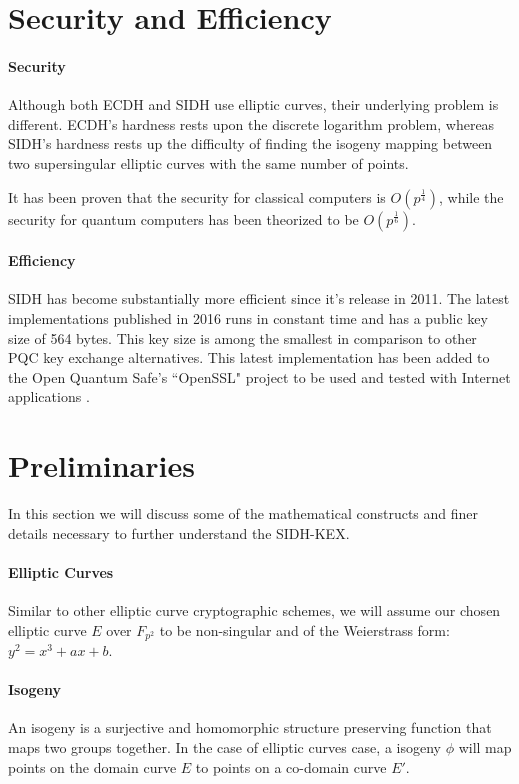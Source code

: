 \documentclass[10pt,twocolumn]{article} %
\begin{document}
\section{Security and Efficiency}
\paragraph{Security} Although both ECDH and SIDH use elliptic curves, their underlying problem is different. ECDH's hardness rests upon the discrete logarithm problem, whereas SIDH's hardness rests up the difficulty of finding the isogeny mapping between two supersingular elliptic curves with the same number of points. 
\par It has been proven \cite{delfs2016computing,biasse2014quantum} that the security for classical computers is $O(p^\frac{1}{4})$, while the security for quantum computers has been theorized to be  $O(p^\frac{1}{6})$.
\paragraph{Efficiency} SIDH has become substantially more efficient since it's release in 2011. The latest implementations published in 2016 runs in constant time and has a public key size of 564 bytes. This key size is among the smallest in comparison to other PQC key exchange alternatives. This latest implementation has been added to the Open Quantum Safe's ``OpenSSL" project to be used and tested with Internet applications \cite{openssl}.

\section{Preliminaries}

In this section we will discuss some of the mathematical constructs and finer details necessary to further understand the SIDH-KEX.

\paragraph{Elliptic Curves}
Similar to other elliptic curve cryptographic schemes, we will assume our chosen elliptic curve $E$ over $F_{p^2}$ to be non-singular and of the Weierstrass form: $y^2 = x^3 + ax + b$.

\paragraph{Isogeny} An isogeny is a surjective and homomorphic structure preserving function that maps two groups together. In the case of elliptic curves case, a  isogeny $\phi$ will map points on the domain curve $E$ to points on a co-domain curve $E'$.
\end{document}
